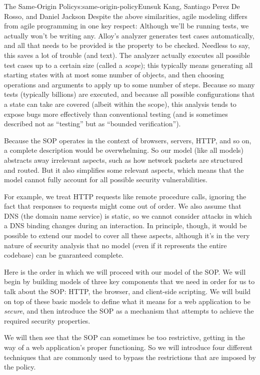 \begin{aosachapter}{The Same-Origin Policy}{s:same-origin-policy}{Eunsuk Kang, Santiago Perez De Rosso, and Daniel Jackson}
Despite the above similarities, agile modeling differs from agile
programming in one key respect: Although we'll be running tests, we
actually won't be writing any. Alloy's analyzer generates test cases
automatically, and all that needs to be provided is the property to be
checked. Needless to say, this saves a lot of trouble (and text). The
analyzer actually executes all possible test cases up to a certain size
(called a \emph{scope}); this typically means generating all starting
states with at most some number of objects, and then choosing operations
and arguments to apply up to some number of steps. Because so many tests
(typically billions) are executed, and because all possible
configurations that a state can take are covered (albeit within the
scope), this analysis tends to expose bugs more effectively than
conventional testing (and is sometimes described not as ``testing'' but
as ``bounded verification'').

\label{simplifications}

Because the SOP operates in the context of browsers, servers, HTTP, and
so on, a complete description would be overwhelming. So our model (like
all models) abstracts away irrelevant aspects, such as how network
packets are structured and routed. But it also simplifies some relevant
aspects, which means that the model cannot fully account for all
possible security vulnerabilities.

For example, we treat HTTP requests like remote procedure calls,
ignoring the fact that responses to requests might come out of order. We
also assume that DNS (the domain name service) is static, so we cannot
consider attacks in which a DNS binding changes during an interaction.
In principle, though, it would be possible to extend our model to cover
all these aspects, although it's in the very nature of security analysis
that no model (even if it represents the entire codebase) can be
guaranteed complete.

\label{roadmap}

Here is the order in which we will proceed with our model of the SOP. We
will begin by building models of three key components that we need in
order for us to talk about the SOP: HTTP, the browser, and client-side
scripting. We will build on top of these basic models to define what it
means for a web application to be \emph{secure}, and then introduce the
SOP as a mechanism that attempts to achieve the required security
properties.

We will then see that the SOP can sometimes be too restrictive, getting
in the way of a web application's proper functioning. So we will
introduce four different techniques that are commonly used to bypass the
restrictions that are imposed by the policy.


\end{aosachapter}

